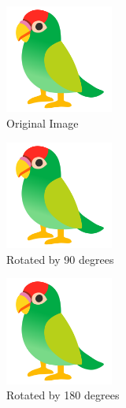 \documentclass{article}
\begin{document}
	\listoffigures
	\pagebreak

	\begin{figure}[h]
		\centering
		\includegraphics[width=1.4in]{images/parrot.png}
		\caption{Original Image}
	\end{figure}
    
	\begin{figure}[h]
		\centering
		\includegraphics[width=1.4in, angle=90]{images/parrot.png}
		\caption{Rotated by 90 degrees}
	\end{figure}

	\begin{figure}[h]
		\centering
		\includegraphics[width=1.4in, angle=180]{images/parrot.png}
		\caption{Rotated by 180 degrees}
	\end{figure}

	\pagebreak
	
\end{document}
